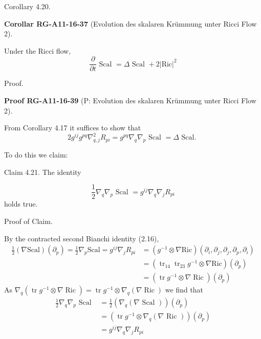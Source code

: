 \documentclass[10pt, letterpaper]{article}
\newcommand{\CustomHeading}[3]{%
  \par\medskip\noindent%
  \textbf{#1 #2} \textnormal{(#3)}.\enskip%
}
\newenvironment{KORO}[2]{\begin{unitbox}\CustomHeading{Corollar}{#1}{#2}}{\end{unitbox}}
\newenvironment{PROOF}[2]{\begin{unitbox}\CustomHeading{Proof}{#1}{#2}}{\end{unitbox}}
\begin{document}
Corollary 4.20. 

\begin{KORO}{RG-A11-16-37}{Evolution des skalaren Krümmung unter Ricci Flow 2}
Under the Ricci flow,
$$
\frac{\partial}{\partial t} \text { Scal }=\Delta \text { Scal }+2  |\text{Ric}|^{2}
$$
\end{KORO}

Proof. 

\begin{PROOF}{RG-A11-16-39}{P: Evolution des skalaren Krümmung unter Ricci Flow 2}
From Corollary 4.17 it suffices to show that
$$
2 g^{i j} g^{p q} \nabla_{q, j}^{2} R_{p i}=g^{p q} \nabla_{q} \nabla_{p} \text { Scal }=\Delta \text { Scal. }
$$

To do this we claim:

Claim 4.21. The identity

$$
\frac{1}{2} \nabla_{q} \nabla_{p} \text { Scal }=g^{i j} \nabla_{q} \nabla_{j} R_{p i}
$$
holds true.

Proof of Claim. 

By the contracted second Bianchi identity (2.16),
$$
\begin{aligned}
\frac{1}{2}(\nabla \mathrm{Scal})\left(\partial_{p}\right)=\frac{1}{2} \nabla_{p} \mathrm{Scal}=g^{i j} \nabla_{j} R_{p i} & =\left(g^{-1} \otimes \nabla \mathrm{Ric}\right)\left(\partial_{i}, \partial_{j}, \partial_{j}, \partial_{p}, \partial_{i}\right) \\
& =\left(\operatorname{tr}_{14} \operatorname{tr}_{23} g^{-1} \otimes \nabla \mathrm{Ric}\right)\left(\partial_{p}\right) \\
& =\left(\operatorname{tr} g^{-1} \otimes \nabla \operatorname{Ric}\right)\left(\partial_{p}\right)
\end{aligned}
$$
As $\nabla_{q}\left(\operatorname{tr} g^{-1} \otimes \nabla \operatorname{Ric}\right)=\operatorname{tr} g^{-1} \otimes \nabla_{q}(\nabla \operatorname{Ric})$ we find that
$$
\begin{aligned}
\frac{1}{2} \nabla_{q} \nabla_{p} \text { Scal } & =\frac{1}{2}\left(\nabla_{q}(\nabla \text { Scal })\right)\left(\partial_{p}\right) \\
& =\left(\operatorname{tr} g^{-1} \otimes \nabla_{q}(\nabla \text { Ric })\right)\left(\partial_{p}\right) \\
& =g^{i j} \nabla_{q} \nabla_{j} R_{p i}
\end{aligned}
$$
\end{PROOF}
\end{document}
